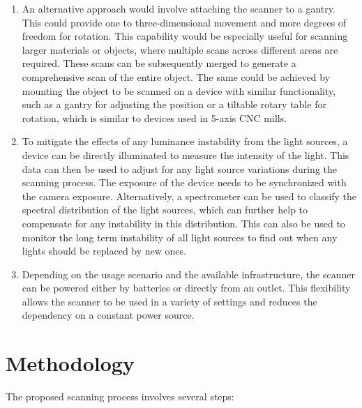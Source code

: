 \documentclass[11pt, twoside, listof=totocnumbered, bibliography=totocnumbered]{scrartcl}
\begin{document}
\begin{enumerate}
	\item An alternative approach would involve attaching the scanner to a gantry. This could provide one to three-dimensional movement and more degrees of freedom for rotation. This capability would be especially useful for scanning larger materials or objects, where multiple scans across different areas are required. These scans can be subsequently merged to generate a comprehensive scan of the entire object. The same could be achieved by mounting the object to be scanned on a device with similar functionality, such as a gantry for adjusting the position or a tiltable rotary table for rotation, which is similar to devices used in 5-axis CNC mills.
	
	\item To mitigate the effects of any luminance instability from the light sources, a device can be directly illuminated to measure the intensity of the light. This data can then be used to adjust for any light source variations during the scanning process. The exposure of the device needs to be synchronized with the camera exposure. Alternatively, a spectrometer can be used to classify the spectral distribution of the light sources, which can further help to compensate for any instability in this distribution. This can also be used to monitor the long term instability of all light sources to find out when any lights should be replaced by new ones.
	
	\item Depending on the usage scenario and the available infrastructure, the scanner can be powered either by batteries or directly from an outlet. This flexibility allows the scanner to be used in a variety of settings and reduces the dependency on a constant power source.
\end{enumerate}
	
\section{Methodology}
The proposed scanning process involves several steps:
\end{document}
